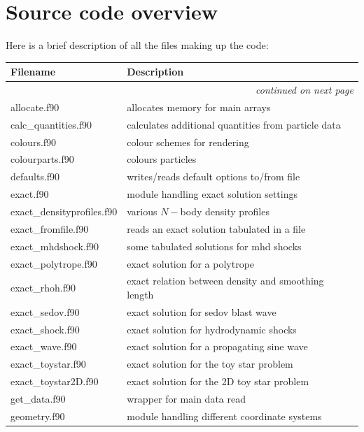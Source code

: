 \documentclass[a4paper,10pt]{article}
\begin{document}
\newpage
\appendix

\section{Source code overview}
Here is a brief description of all the files making up the code:
\begin{longtable}{|lp{}|}
\hline
Filename & Description \\
\hline \endhead
\multicolumn{2}{|r|}{\emph{continued on next page}} \\
\hline \endfoot
\hline \endlastfoot
     allocate.f90           & allocates memory for main arrays \\
     calc\_quantities.f90    & calculates additional quantities from particle data \\
     colours.f90            & colour schemes for rendering\\
     colourparts.f90	 & colours particles\\
     defaults.f90           & writes/reads default options to/from file\\
     exact.f90              & module handling exact solution settings\\
     exact\_densityprofiles.f90 & various $N-$body density profiles \\
     exact\_fromfile.f90     & reads an exact solution tabulated in a file\\
     exact\_mhdshock.f90     & some tabulated solutions for mhd shocks\\ 
     exact\_polytrope.f90    & exact solution for a polytrope\\
     exact\_rhoh.f90	 & exact relation between density and smoothing length\\
     exact\_sedov.f90        & exact solution for sedov blast wave\\
     exact\_shock.f90        & exact solution for hydrodynamic shocks\\
     exact\_wave.f90         & exact solution for a propagating sine wave\\
     exact\_toystar.f90      & exact solution for the toy star problem\\
     exact\_toystar2D.f90    & exact solution for the 2D toy star problem\\
     get\_data.f90           & wrapper for main data read\\
     geometry.f90           & module handling different coordinate systems\\

\end{longtable}
\end{document}
